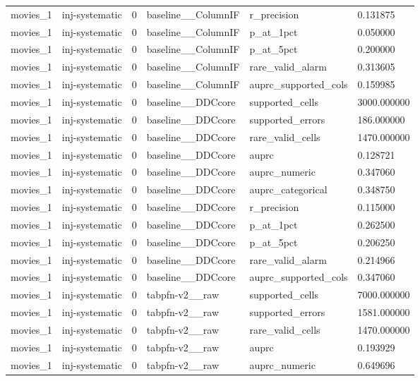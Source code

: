 \begin{tabular}{llllll}
movies\_1 & inj-systematic & 0 & baseline\_\_ColumnIF & r\_precision & 0.131875 \\
movies\_1 & inj-systematic & 0 & baseline\_\_ColumnIF & p\_at\_1pct & 0.050000 \\
movies\_1 & inj-systematic & 0 & baseline\_\_ColumnIF & p\_at\_5pct & 0.200000 \\
movies\_1 & inj-systematic & 0 & baseline\_\_ColumnIF & rare\_valid\_alarm & 0.313605 \\
movies\_1 & inj-systematic & 0 & baseline\_\_ColumnIF & auprc\_supported\_cols & 0.159985 \\
movies\_1 & inj-systematic & 0 & baseline\_\_DDCcore & supported\_cells & 3000.000000 \\
movies\_1 & inj-systematic & 0 & baseline\_\_DDCcore & supported\_errors & 186.000000 \\
movies\_1 & inj-systematic & 0 & baseline\_\_DDCcore & rare\_valid\_cells & 1470.000000 \\
movies\_1 & inj-systematic & 0 & baseline\_\_DDCcore & auprc & 0.128721 \\
movies\_1 & inj-systematic & 0 & baseline\_\_DDCcore & auprc\_numeric & 0.347060 \\
movies\_1 & inj-systematic & 0 & baseline\_\_DDCcore & auprc\_categorical & 0.348750 \\
movies\_1 & inj-systematic & 0 & baseline\_\_DDCcore & r\_precision & 0.115000 \\
movies\_1 & inj-systematic & 0 & baseline\_\_DDCcore & p\_at\_1pct & 0.262500 \\
movies\_1 & inj-systematic & 0 & baseline\_\_DDCcore & p\_at\_5pct & 0.206250 \\
movies\_1 & inj-systematic & 0 & baseline\_\_DDCcore & rare\_valid\_alarm & 0.214966 \\
movies\_1 & inj-systematic & 0 & baseline\_\_DDCcore & auprc\_supported\_cols & 0.347060 \\
movies\_1 & inj-systematic & 0 & tabpfn-v2\_\_raw & supported\_cells & 7000.000000 \\
movies\_1 & inj-systematic & 0 & tabpfn-v2\_\_raw & supported\_errors & 1581.000000 \\
movies\_1 & inj-systematic & 0 & tabpfn-v2\_\_raw & rare\_valid\_cells & 1470.000000 \\
movies\_1 & inj-systematic & 0 & tabpfn-v2\_\_raw & auprc & 0.193929 \\
movies\_1 & inj-systematic & 0 & tabpfn-v2\_\_raw & auprc\_numeric & 0.649696 \\

\end{tabular}

